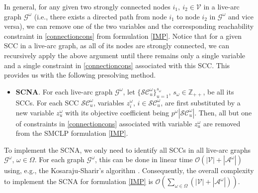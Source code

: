 \documentclass[a4paper,10pt]{article}
\theoremstyle{plain}
\newtheorem{proposition}[theorem]{Proposition}
\newcommand{\revv}[1]{{#1}}
\begin{document}
	In general, for any given two strongly connected nodes $i_1,~i_2\in\mathcal{V}$ in a live-arc graph  $\mathcal{G}^\omega$ (i.e., there exists a directed path from node $i_1$ to node $i_2$ in $\mathcal{G}^{\omega}$ and vice versa), 
	we can remove one of the two variables and the corresponding reachability constraint in \eqref{connectioncons} from formulation \eqref{IMP}.
	Notice that for a given SCC in a live-arc graph, as all of its nodes are strongly connected, we can recursively apply the above argument until there remains only a single variable and a single constraint in \eqref{connectioncons} associated with this SCC.
	This provides us with the following presolving method.
	\begin{itemize}
		\item []
		{\bf SCNA}. For each live-arc graph $\mathcal{G}^\omega$, let $\{\mathcal{SC}_u^\omega\}_{u=1}^{\revv{s_\omega}}$, $\revv{s_\omega} \in \mathbb{Z}_{++}$, be all its SCCs. 
		For each SCC $\mathcal{SC}_u^\omega$, variables $z_{\revv{i}}^{\omega}$, $\revv{i} \in \mathcal{SC}_u^\omega$, 
		are first substituted by a new variable $z_u^\omega$ with its objective coefficient being $p^\omega |\mathcal{SC}_u^\omega|$.
		Then, all but one of constraints in \eqref{connectioncons} associated with variable $z_u^\omega$ are removed from the SMCLP formulation \eqref{IMP}.
	\end{itemize}
	To implement the SCNA, we only need to identify all SCCs in all live-arc graphs $\mathcal{G}^{\omega}$, $\omega \in \Omega$.
	For each graph $\mathcal{G}^\omega$, this can be done in linear time  $\mathcal{O}(|\mathcal{V}|+|\mathcal{A}^{\omega}|)$ using, e.g., the Kosaraju-Sharir's algorithm \cite{Sharir}.
	Consequently, the overall complexity to implement the SCNA for formulation \eqref{IMP} is $\mathcal{O}(\sum_{\omega\in \Omega}(|\mathcal{V}|+|\mathcal{A}^\omega|))
	$.
	
\end{document}
